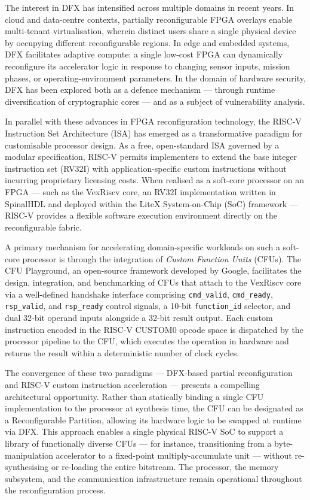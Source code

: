 The interest in DFX has intensified across multiple domains in recent years. In cloud and data-centre contexts, partially reconfigurable FPGA overlays enable multi-tenant virtualisation, wherein distinct users share a single physical device by occupying different reconfigurable regions. In edge and embedded systems, DFX facilitates adaptive compute: a single low-cost FPGA can dynamically reconfigure its accelerator logic in response to changing sensor inputs, mission phases, or operating-environment parameters. In the domain of hardware security, DFX has been explored both as a defence mechanism — through runtime diversification of cryptographic cores — and as a subject of vulnerability analysis.

In parallel with these advances in FPGA reconfiguration technology, the RISC-V Instruction Set Architecture (ISA) has emerged as a transformative paradigm for customisable processor design. As a free, open-standard ISA governed by a modular specification, RISC-V permits implementers to extend the base integer instruction set (RV32I) with application-specific custom instructions without incurring proprietary licensing costs. When realised as a soft-core processor on an FPGA — such as the VexRiscv core, an RV32I implementation written in SpinalHDL and deployed within the LiteX System-on-Chip (SoC) framework — RISC-V provides a flexible software execution environment directly on the reconfigurable fabric.

A primary mechanism for accelerating domain-specific workloads on such a soft-core processor is through the integration of \textit{Custom Function Units} (CFUs). The CFU Playground, an open-source framework developed by Google, facilitates the design, integration, and benchmarking of CFUs that attach to the VexRiscv core via a well-defined handshake interface comprising \texttt{cmd\_valid}, \texttt{cmd\_ready}, \texttt{rsp\_valid}, and \texttt{rsp\_ready} control signals, a 10-bit \texttt{function\_id} selector, and dual 32-bit operand inputs alongside a 32-bit result output. Each custom instruction encoded in the RISC-V CUSTOM0 opcode space is dispatched by the processor pipeline to the CFU, which executes the operation in hardware and returns the result within a deterministic number of clock cycles.

The convergence of these two paradigms — DFX-based partial reconfiguration and RISC-V custom instruction acceleration — presents a compelling architectural opportunity. Rather than statically binding a single CFU implementation to the processor at synthesis time, the CFU can be designated as a Reconfigurable Partition, allowing its hardware logic to be swapped at runtime via DFX. This approach enables a single physical RISC-V SoC to support a library of functionally diverse CFUs — for instance, transitioning from a byte-manipulation accelerator to a fixed-point multiply-accumulate unit — without re-synthesising or re-loading the entire bitstream. The processor, the memory subsystem, and the communication infrastructure remain operational throughout the reconfiguration process.

